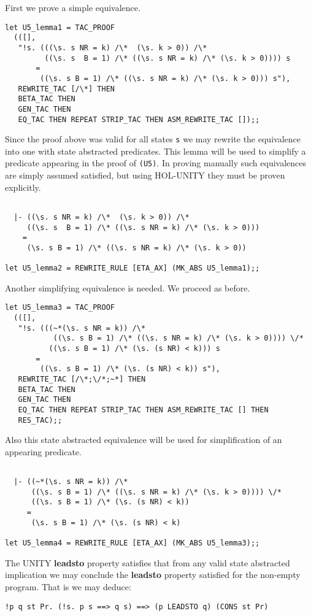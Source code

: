 First we prove a simple equivalence.
{\footnotesize
\begin{verbatim}
let U5_lemma1 = TAC_PROOF
  (([],
   "!s. (((\s. s NR = k) /\*  (\s. k > 0)) /\*
         ((\s. s  B = 1) /\* ((\s. s NR = k) /\* (\s. k > 0)))) s
       =
        ((\s. s B = 1) /\* ((\s. s NR = k) /\* (\s. k > 0))) s"),
   REWRITE_TAC [/\*] THEN
   BETA_TAC THEN
   GEN_TAC THEN
   EQ_TAC THEN REPEAT STRIP_TAC THEN ASM_REWRITE_TAC []);;
\end{verbatim}
}

Since the proof above was valid for all states {\tt s} we may rewrite the
equivalence into one with state abstracted predicates.  This lemma will
be used to simplify a predicate appearing in the proof of {\tt (U5)}.
In proving manually such equivalences are simply assumed satisfied, but
using HOL-UNITY they must be proven explicitly.
{\footnotesize
\begin{verbatim}

  |- ((\s. s NR = k) /\*  (\s. k > 0)) /\*
     ((\s. s  B = 1) /\* ((\s. s NR = k) /\* (\s. k > 0)))
    =
     (\s. s B = 1) /\* ((\s. s NR = k) /\* (\s. k > 0))

let U5_lemma2 = REWRITE_RULE [ETA_AX] (MK_ABS U5_lemma1);;
\end{verbatim}
}

Another simplifying equivalence is needed. We proceed as before.
{\footnotesize
\begin{verbatim}
let U5_lemma3 = TAC_PROOF
  (([],
   "!s. (((~*(\s. s NR = k)) /\*
           ((\s. s B = 1) /\* ((\s. s NR = k) /\* (\s. k > 0)))) \/*
          ((\s. s B = 1) /\* (\s. (s NR) < k))) s
       =
        ((\s. s B = 1) /\* (\s. (s NR) < k)) s"),
   REWRITE_TAC [/\*;\/*;~*] THEN
   BETA_TAC THEN
   GEN_TAC THEN
   EQ_TAC THEN REPEAT STRIP_TAC THEN ASM_REWRITE_TAC [] THEN
   RES_TAC);;
\end{verbatim}
}

Also this state abstracted equivalence will be used for simplification of an
appearing predicate.
{\footnotesize
\begin{verbatim}

  |- ((~*(\s. s NR = k)) /\*
      ((\s. s B = 1) /\* ((\s. s NR = k) /\* (\s. k > 0)))) \/*
      ((\s. s B = 1) /\* (\s. (s NR) < k))
     =
      (\s. s B = 1) /\* (\s. (s NR) < k)

let U5_lemma4 = REWRITE_RULE [ETA_AX] (MK_ABS U5_lemma3);;
\end{verbatim}
}

The UNITY {\bf leadsto} property satisfies that from any valid state abstracted
implication we may conclude the {\bf leadsto} property satisfied for the
non-empty program. That is we may deduce:
{\footnotesize
\begin{verbatim}
!p q st Pr. (!s. p s ==> q s) ==> (p LEADSTO q) (CONS st Pr)
\end{verbatim}
}

